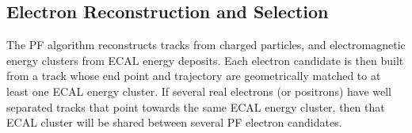 %



\subsection{Electron Reconstruction and Selection}
\label{eleRecoAndSelection}
The PF algorithm reconstructs tracks from charged particles, and electromagnetic energy
clusters from ECAL energy deposits.  Each electron candidate is then built from a track
whose end point and trajectory are geometrically matched to at least one ECAL energy
cluster.  If several real electrons (or positrons) have well separated tracks that point
towards the same ECAL energy cluster, then that ECAL cluster will be shared between
several PF electron candidates.

